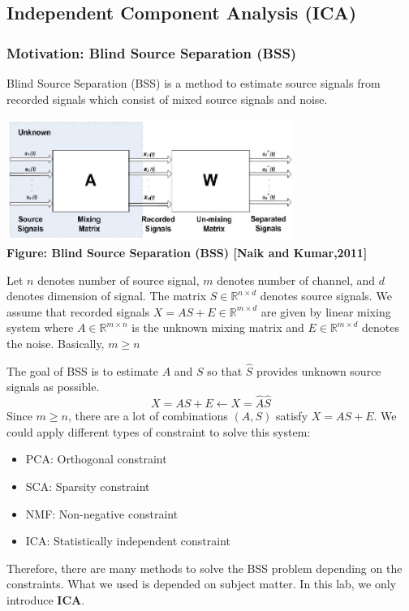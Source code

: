 \documentclass[a4 paper]{article}
\begin{document}
\subsection{Independent Component Analysis (ICA)}
\subsubsection{Motivation: Blind Source Separation (BSS)}
\par Blind Source Separation (BSS) is a method to estimate source signals from recorded signals which consist of mixed source signals and noise.
\begin{center}
    \includegraphics[height=4cm]{figure/Blind-source-separation-BSS-block-diagram-s-t-are-the-sources-x-t-are-the.png}\\
    \textbf{Figure: Blind Source Separation (BSS) [Naik and Kumar,2011]}
\end{center}

\begin{tcolorbox}[colback=RoyalBlue!5!white,colframe=RoyalBlue!75!black,title=Model Formalization]
\par Let $n$ denotes number of source signal, $m$ denotes number of channel, and $d$ denotes dimension of signal. The matrix $S\in\mathbb{R}^{n\times d}$ denotes source signals. We assume that recorded signals $X=AS+E\in\mathbb{R}^{m\times d}$ are given by linear mixing system where $A\in\mathbb{R}^{m\times n}$ is the unknown mixing matrix and $E\in\mathbb{R}^{m\times d}$ denotes the noise. Basically, $m\geq n$
\end{tcolorbox}
The goal of BSS is to estimate $A$ and $S$ so that $\hat{S}$ provides unknown source signals as possible.
    $$X=AS+E\leftarrow X=\hat{A}\hat{S}$$
Since $m\geq n$, there are a lot of combinations $(A,S)$ satisfy $X=AS+E$.
    We could apply different types of constraint to solve this system:
\begin{multicols}{2}
\begin{itemize}
    \item PCA: Orthogonal constraint
    \item SCA: Sparsity constraint
\end{itemize}
\columnbreak
\begin{itemize}
    \item NMF: Non-negative constraint
    \item ICA: Statistically independent constraint
\end{itemize}
\end{multicols}
Therefore, there are many methods to solve the BSS problem depending on the constraints. What we used is depended on subject matter. In this lab, we only introduce \textbf{ICA}.
\end{document}
